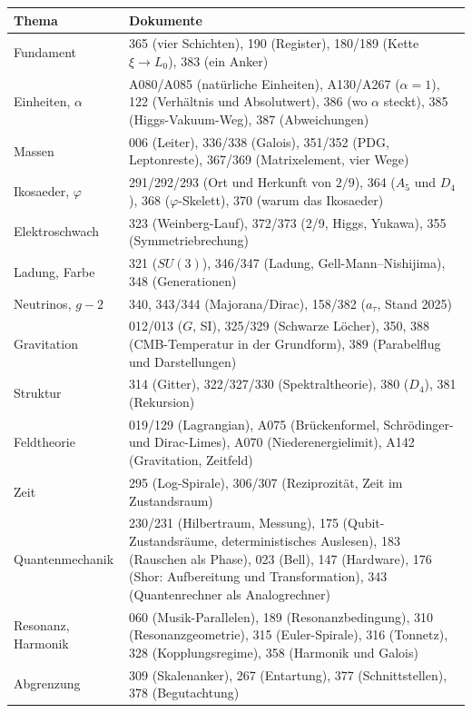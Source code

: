 \begin{center}
\small
{}
\begin{tabular}{@{}p{3.2cm}p{11cm}@{}}
\toprule
\textbf{Thema} & \textbf{Dokumente} \\
\midrule
Fundament & 365 (vier Schichten), 190 (Register), 180/189 (Kette $\xi\to L_0$), 383 (ein Anker) \\
Einheiten, $\alpha$ & A080/A085 (natürliche Einheiten), A130/A267 ($\alpha=1$), 122 (Verhältnis und Absolutwert), 386 (wo $\alpha$ steckt), 385 (Higgs-Vakuum-Weg), 387 (Abweichungen) \\
Massen & 006 (Leiter), 336/338 (Galois), 351/352 (PDG, Leptonreste), 367/369 (Matrixelement, vier Wege) \\
Ikosaeder, $\varphi$ & 291/292/293 (Ort und Herkunft von $2/9$), 364 ($A_5$ und $D_4$), 368 ($\varphi$-Skelett), 370 (warum das Ikosaeder) \\
Elektroschwach & 323 (Weinberg-Lauf), 372/373 (2/9, Higgs, Yukawa), 355 (Symmetriebrechung) \\
Ladung, Farbe & 321 ($SU(3)$), 346/347 (Ladung, Gell-Mann--Nishijima), 348 (Generationen) \\
Neutrinos, $g-2$ & 340, 343/344 (Majorana/Dirac), 158/382 ($a_\tau$, Stand 2025) \\
Gravitation & 012/013 ($G$, SI), 325/329 (Schwarze Löcher), 350, 388 (CMB-Temperatur in der Grundform), 389 (Parabelflug und Darstellungen) \\
Struktur & 314 (Gitter), 322/327/330 (Spektraltheorie), 380 ($D_4$), 381 (Rekursion) \\
Feldtheorie & 019/129 (Lagrangian), A075 (Brückenformel, Schrödinger- und Dirac-Limes), A070 (Niederenergielimit), A142 (Gravitation, Zeitfeld) \\
Zeit & 295 (Log-Spirale), 306/307 (Reziprozität, Zeit im Zustandsraum) \\
Quantenmechanik & 230/231 (Hilbertraum, Messung), 175 (Qubit-Zustandsräume, deterministisches Auslesen), 183 (Rauschen als Phase), 023 (Bell), 147 (Hardware), 176 (Shor: Aufbereitung und Transformation), 343 (Quantenrechner als Analogrechner) \\
Resonanz, Harmonik & 060 (Musik-Parallelen), 189 (Resonanzbedingung), 310 (Resonanzgeometrie), 315 (Euler-Spirale), 316 (Tonnetz), 328 (Kopplungsregime), 358 (Harmonik und Galois) \\
Abgrenzung & 309 (Skalenanker), 267 (Entartung), 377 (Schnittstellen), 378 (Begutachtung) \\
\bottomrule
\end{tabular}
\end{center}

